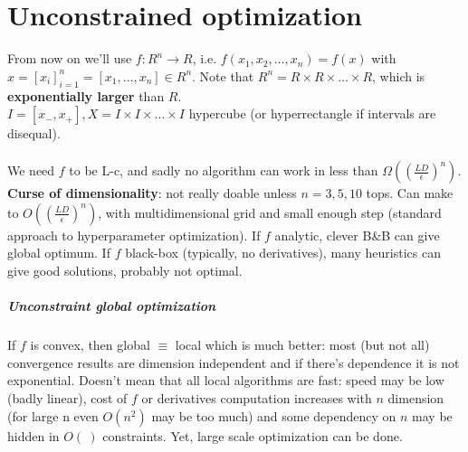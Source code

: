 \documentclass[10pt]{report}
\begin{document}
\section{Unconstrained optimization}
From now on we'll use $f:R^n\rightarrow R$, i.e. $f(x_1,x_2,\ldots,x_n) = f(x)$ with $x = [x_i]_{i=1}^n = [x_1,\ldots,x_n]\in R^n$. Note that $R^n = R\times R \times\ldots\times R$, which is \textbf{exponentially larger} than $R$.\\
$I = [x_-, x_+], X = I\times I \times\ldots\times I$ hypercube (or hyperrectangle if intervals are disequal).\\\\
We need $f$ to be L-c, and sadly no algorithm can work in less than $\Omega((\frac{LD}{\epsilon})^n)$. \textbf{Curse of dimensionality}: not really doable unless $n = 3, 5, 10$ tops. Can make to $O((\frac{LD}{\epsilon})^n)$, with multidimensional grid and small enough step (standard approach to hyperparameter optimization). If $f$ analytic, clever B\&B can give global optimum. If $f$ black-box (typically, no derivatives), many heuristics can give good solutions, probably not optimal.
\subparagraph{Unconstraint global optimization} If $f$ is convex, then global $\equiv$ local which is much better: most (but not all) convergence results are dimension independent and if there's dependence it is not exponential. Doesn't mean that all local algorithms are fast: speed may be low (badly linear), cost of $f$ or derivatives computation increases with $n$ dimension (for large n even $O(n^2)$ may be too much) and some dependency on $n$ may be hidden in $O(\:)$ constraints. Yet, large scale optimization can be done.
\end{document}
